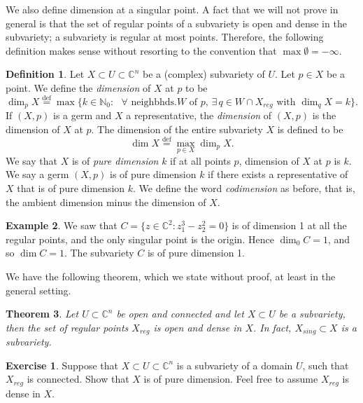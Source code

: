 \documentclass[12pt,openany]{book}
\newcommand{\C}{{\mathbb{C}}}
\newcommand{\N}{{\mathbb{N}}}
\newcommand{\myindex}[1]{#1\index{#1}}
\theoremstyle{plain}
\newtheorem{thm}{Theorem}[section]
\theoremstyle{remark}
\theoremstyle{definition}
\newtheorem{defn}[thm]{Definition}
\newenvironment{exbox}{%
    \def\FrameCommand{\vrule width 1pt \relax\hspace{10pt}}%
    \MakeFramed{\advance\hsize-\width\FrameRestore}%
}{%
    \endMakeFramed
}
\theoremstyle{exercise}
\newtheorem{exercise}{Exercise}[section]
\theoremstyle{example}
\newtheorem{example}[thm]{Example}
\begin{document}
We also define dimension at a singular point.
A fact that we will not prove in general is that
the set of regular points of a
subvariety is open and dense in the subvariety; a
subvariety is regular at most points.  Therefore, the 
following definition makes sense without resorting to
the convention that $\max \emptyset = -\infty$.

\begin{defn}
Let $X \subset U \subset \C^n$ be a (complex) subvariety of $U$.  Let $p \in
X$ be a point.  We define the \emph{\myindex{dimension}} of $X$ at $p$
to be
%
\begin{equation*}
\dim_p X \overset{\text{def}}{=}
\max \bigl\{ k \in \N_0 : \text{ $\forall$ neighbhds.
$W$ of $p$, $\exists \, q \in W \cap X_{\mathit{reg}}$ with $\dim_q X = k$}
\bigr\} .
\end{equation*}
If $(X,p)$ is a germ and $X$ a representative,
the \emph{dimension} of $(X,p)$ is the dimension of
$X$ at $p$.
The dimension of the entire subvariety $X$ is defined to be
%
\begin{equation*}
\dim X \overset{\text{def}}{=}
\max_{p \in X} \dim_p X .
\end{equation*}
We say that $X$ is of \emph{\myindex{pure dimension}} $k$ if at
all points $p$, dimension of $X$ at $p$ is $k$.  
We say a germ $(X,p)$ is of pure dimension $k$ if there exists a representative
of $X$ that is of pure dimension $k$.
We define the word \emph{codimension} as before, that is, the
ambient dimension minus the dimension of $X$.
\end{defn}

\begin{example}
We saw that $C = \bigl\{ z \in \C^2 : z_1^3-z_2^2 = 0 \bigr\}$ is of
dimension 1 at all the regular points, and the only singular point is the
origin.  Hence $\dim_0 C = 1$, and so $\dim C = 1$.  The subvariety $C$ is
of pure dimension 1.
\end{example}


We have the following theorem, which we
state without proof, at least in the general setting.

\begin{thm}
Let $U \subset \C^n$ be open and connected and let $X \subset U$
be a subvariety, then the set of regular points $X_{\mathit{reg}}$
is open and dense in $X$.
In fact, $X_{\mathit{sing}} \subset X$ is a subvariety.
\end{thm}

\begin{exbox}
\begin{exercise}
Suppose that $X \subset U \subset \C^n$ is a subvariety
of a domain $U$, such that $X_{\mathit{reg}}$ is connected.  Show that $X$ is of
pure dimension.  Feel free to assume $X_{\mathit{reg}}$ is dense in $X$.
\end{exercise}
\end{exbox}
\end{document}
